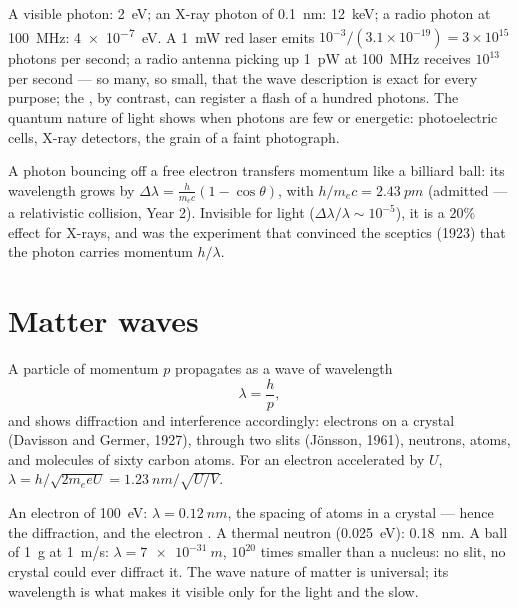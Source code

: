 \begin{example}\label{ex:b1:quantum-introduction:orders}
A visible photon: \qty{2}{eV}; an X-ray photon of \qty{0.1}{nm}: \qty{12}{keV};
a radio photon at \qty{100}{MHz}: \qty{4e-7}{eV}. A \qty{1}{mW} red laser
emits $10^{-3}/(3.1 \times 10^{-19}) = 3 \times 10^{15}$ photons per second;
a radio antenna picking up \qty{1}{pW} at \qty{100}{MHz} receives $10^{13}$
per second --- so many, so small, that the wave description is exact
for every purpose; the , by contrast, can register a flash of a
hundred photons. The quantum nature of light shows when photons are
few or energetic: photoelectric cells, X-ray detectors, the grain of a
faint photograph.
\end{example}

\begin{remark}\label{rem:b1:quantum-introduction:compton}
A photon bouncing off a free electron transfers momentum like a
billiard ball: its wavelength grows by $\Delta\lambda = \frac{h}{m_ec}(1 -
\cos\theta)$, with $h/m_ec = \qty{2.43}{pm}$ (admitted --- a relativistic
collision, Year 2). Invisible for light ($\Delta\lambda/\lambda \sim 10^{-5}$),
it is a $20\%$ effect for X-rays, and was the experiment that convinced
the sceptics (1923) that the photon carries momentum $h/\lambda$.
\end{remark}

\section{Matter waves}

\begin{theorem}[de Broglie]\label{thm:b1:quantum-introduction:debroglie}
A particle of momentum $p$ propagates as a wave of wavelength
\[
\lambda = \frac{h}{p} ,
\]
and shows diffraction and interference accordingly: electrons on a
crystal (Davisson and Germer, 1927), through two slits (Jönsson, 1961),
neutrons, atoms, and molecules of sixty carbon atoms. For an electron
accelerated by $U$, $\lambda = h/\sqrt{2m_eeU} = \qty{1.23}{nm}/\sqrt{U/\unit{V}}$.
\end{theorem}
\admitted

\begin{example}\label{ex:b1:quantum-introduction:wavelengths}
An electron of \qty{100}{eV}: $\lambda = \qty{0.12}{nm}$, the spacing of
atoms in a crystal --- hence the diffraction, and the electron
. A thermal neutron (\qty{0.025}{eV}): \qty{0.18}{nm}. A ball
of \qty{1}{g} at \qty{1}{m/s}: $\lambda = \qty{7e-31}{m}$, $10^{20}$ times
smaller than a nucleus: no slit, no crystal could ever diffract it. The
wave nature of matter is universal; its wavelength is what makes it
visible only for the light and the slow.
\end{example}

